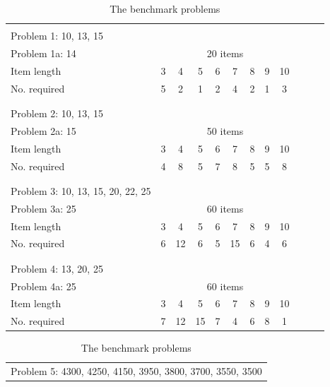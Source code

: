 \documentclass[a4paper]{article}
\begin{document}
\begin{table}[http]
    \centering
    \small
    \caption{The benchmark problems}
    \label{tab:benchmark}
    \begin{tabular}{lccccccccccc}
        \hline
        \\
        Problem 1: 10, 13, 15 \\
        Problem 1a: 14 & \multicolumn{8}{c}{20 items} \\
        \toprule
        Item length & 3 & 4 & 5 & 6 & 7 & 8 & 9 & 10 \\
        No. required & 5 & 2 & 1 & 2 & 4 & 2 & 1 & 3 \\
        \midrule
        \\
        \hline
        \\
        Problem 2: 10, 13, 15  \\
        Problem 2a: 15 & \multicolumn{8}{c}{50 items} \\
        \toprule
        Item length & 3 & 4 & 5 & 6 & 7 & 8 & 9 & 10 \\
        No. required & 4 & 8 & 5 & 7 & 8 & 5 & 5 & 8 \\
        \midrule
        \\
        \hline
        \\
        Problem 3: 10, 13, 15, 20, 22, 25 \\
        Problem 3a: 25 & \multicolumn{8}{c}{60 items} \\
        \toprule
        Item length & 3 & 4 & 5 & 6 & 7 & 8 & 9 & 10 \\
        No. required & 6 & 12 & 6 & 5 & 15 & 6 & 4 & 6 \\
        \midrule
        \\
        \hline
        \\
        Problem 4: 13, 20, 25 \\
        Problem 4a: 25 & \multicolumn{8}{c}{60 items} \\
        \toprule
        Item length & 3 & 4 & 5 & 6 & 7 & 8 & 9 & 10 \\
        No. required & 7 & 12 & 15 & 7 & 4 & 6 & 8 & 1 \\
        \hline
        \midrule                
        \bottomrule
    \end{tabular}      
    \begin{tabular}{lcccccccccc}
        \\
        \hline
        \\
        \toprule
        \multicolumn{11}{l}{Problem 5: 4300, 4250, 4150, 3950, 3800, 3700, 3550, 3500} \\

\end{tabular}
\end{table}
\end{document}
